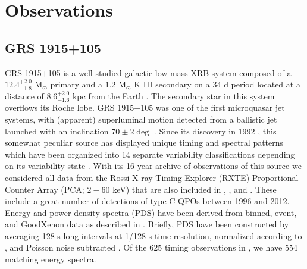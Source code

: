 \documentclass[fleqn,usenatbib,twocolumn]{mnras}%
\begin{document}
\section{Observations}\label{sec:obs}


\subsection{GRS 1915+105}

GRS 1915+105 is a well studied galactic low mass XRB system composed of a $12.4^{+2.0}_{-1.8}$ M$_{\odot}$ primary and a $1.2$ M$_{\odot}$ K III secondary \citep{GRSCompanion,Greiner2003} on a $34$ d period located at a distance of $8.6^{+2.0}_{-1.6}$ kpc from the Earth \citep{GRSDISTANCE}. The secondary star in this system overflows its Roche lobe. GRS 1915+105 was one of the first microquasar jet systems, with (apparent) superluminal motion detected from a ballistic jet launched with an inclination $70\pm2\deg$ \citep{grsjetinclination}. Since its discovery in 1992 \citep{grs-discovery}, this somewhat peculiar source has displayed unique timing and spectral patterns which have been organized into 14 separate variability classifications depending on its variability state \citep{belloni2000,Hannikainen2005}. With its 16-year archive of observations of this source we considered all data from the Rossi X-ray Timing Explorer (RXTE) Proportional Counter Array (PCA; $2-60$ keV) that are also included in \cite{GRSDATAPAPER}, \cite{mendez2022couplingNATURE}, and \cite{garciaGRS2022MNRAS}. These include a great number of detections of type C QPOs between 1996 and 2012. Energy and power-density spectra (PDS) have been derived from binned, event, and GoodXenon data as described in \cite{GRSDATAPAPER}. Briefly, PDS have been constructed by averaging 128 s long intervals at 1/128 s time resolution, normalized according to \cite{leahy1983norm}, and Poisson noise subtracted \citep{zhangPDSsubtraction}. Of the 625 timing observations in \cite{GRSDATAPAPER}, we have 554 matching energy spectra.  
\end{document}
